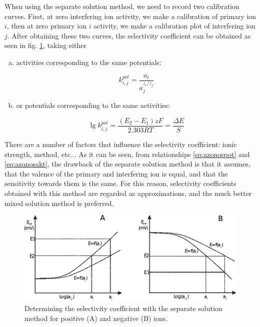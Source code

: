 When using the separate solution method, we need to record two calibration curves.
First, at zero interfering ion activity, we make a calibration of primary ion $i$, then at zero primary ion $i$ activity, we make a calibration plot of interfering ion $j$.
After obtaining these two curves, the selectivity coefficient can be obtained as seen in fig. \ref{fig:ion2}, taking either

\begin{enumerate}[(a)]
\item activities corresponding to the same potentials:

\begin{equation}
\label{eq:azonospot}
        k_{i,j}^{pot}
        =
        \frac{a_i}{a_j^{z_i/z_j}}
\end{equation}

\item or potentials corresponding to the same activities:

\begin{equation}
\label{eq:azonosakt}
        \lg k_{i,j}^{pot}
        =
        \frac{(E_2-E_1)zF}{2.303RT}
	=
	\frac{\Delta E}{S}
\end{equation}

\end{enumerate}

There are a number of factors that influence the selectivity coefficient: ionic strength, method, etc...
As it can be seen, from relationships \ref{eq:azonospot} and \ref{eq:azonosakt}, the drawback of the separate solution method is that it assumes, that the valence of the primary and interfering ion is equal, and that the sensitivity towards them is the same.
For this reason, selectivity coefficients obtained with this method are regarded as approximations, and the much better mixed solution method is preferred.

\begin{figure}
\centering
\includegraphics{fig/ion2.eps}
\caption{Determining the selectivity coefficient with the separate solution method for positive (A) and negative (B) ions.}
\label{fig:ion2}
\end{figure}

